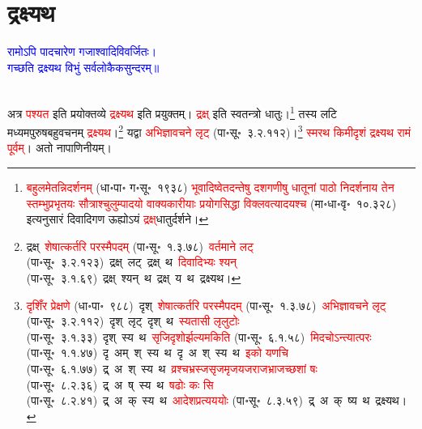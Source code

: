\section[द्रक्ष्यथ]{द्रक्ष्यथ}
\centering\textcolor{blue}{रामोऽपि पादचारेण गजाश्वादिविवर्जितः।\nopagebreak\\
गच्छति द्रक्ष्यथ विभुं सर्वलोकैकसुन्दरम्॥}\nopagebreak\\
\\
\fontsize{14}{21}\selectfont\begin{sloppypar}\justifying\noindent\hspace{10mm} अत्र \textcolor{red}{पश्यत} इति प्रयोक्तव्ये \textcolor{red}{द्रक्ष्यथ} इति प्रयुक्तम्। \textcolor{red}{द्रक्ष्} इति स्वतन्त्रो धातुः।\footnote{\textcolor{red}{बहुलमेतन्निदर्शनम्} (धा॰पा॰ ग॰सू॰~१९३८) \textcolor{red}{भूवादिष्वेतदन्तेषु दशगणीषु धातूनां पाठो निदर्शनाय तेन स्तम्भुप्रभृतयः सौत्राश्चुलुम्पादयो वाक्यकारीयाः प्रयोगसिद्धा विक्लवत्यादयश्च} (मा॰धा॰वृ॰~१०.३२८) इत्यनुसारं दिवादिगण ऊह्योऽयं \textcolor{red}{द्रक्ष्‌}\-धातुर्दर्शने।} तस्य लटि मध्यम\-पुरुष\-बहु\-वचनम् \textcolor{red}{द्रक्ष्यथ}।\footnote{ द्रक्ष्~\arrow \textcolor{red}{शेषात्कर्तरि परस्मैपदम्} (पा॰सू॰~१.३.७८)~\arrow \textcolor{red}{वर्तमाने लट्} (पा॰सू॰~३.२.१२३)~\arrow द्रक्ष्~लट्~\arrow द्रक्ष्~थ~\arrow \textcolor{red}{दिवादिभ्यः श्यन्} (पा॰सू॰~३.१.६९)~\arrow द्रक्ष्~श्यन्~थ~\arrow द्रक्ष्~य~थ~\arrow द्रक्ष्यथ।} यद्वा \textcolor{red}{अभिज्ञा\-वचने लृट्} (पा॰सू॰~३.२.११२)।\footnote{\textcolor{red}{दृशिँर प्रेक्षणे} (धा॰पा॰~९८८)~\arrow दृश्~\arrow \textcolor{red}{शेषात्कर्तरि परस्मैपदम्} (पा॰सू॰~१.३.७८)~\arrow \textcolor{red}{अभिज्ञा\-वचने लृट्} (पा॰सू॰~३.२.११२)~\arrow दृश्~लृट्~\arrow दृश्~थ~\arrow \textcolor{red}{स्यतासी लृलुटोः} (पा॰सू॰~३.१.३३)~\arrow दृश्~स्य~थ~\arrow \textcolor{red}{सृजि\-दृशोर्झल्यमकिति} (पा॰सू॰~६.१.५८)~\arrow \textcolor{red}{मिदचोऽन्त्यात्परः} (पा॰सू॰~१.१.४७)~\arrow दृ~अम्~श्~स्य~थ~\arrow दृ~अ~श्~स्य~थ~\arrow \textcolor{red}{इको यणचि} (पा॰सू॰~६.१.७७)~\arrow द्र्~अ~श्~स्य~थ~\arrow \textcolor{red}{व्रश्चभ्रस्ज\-सृजमृज\-यजराज\-भ्राजच्छशां षः} (पा॰सू॰~८.२.३६)~\arrow द्र्~अ~ष्~स्य~थ~\arrow \textcolor{red}{षढोः कः सि} (पा॰सू॰~८.२.४१)~\arrow द्र्~अ~क्~स्य~थ~\arrow \textcolor{red}{आदेश\-प्रत्यययोः} (पा॰सू॰~८.३.५९)~\arrow द्र्~अ~क्~ष्य~थ~\arrow द्रक्ष्यथ।} \textcolor{red}{स्मरथ किमीदृशं द्रक्ष्यथ रामं पूर्वम्}। अतो नापाणिनीयम्।\end{sloppypar}
